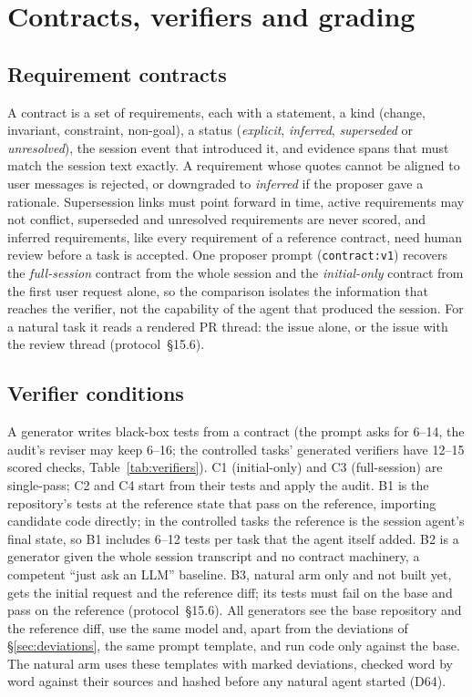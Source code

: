 \section{Contracts, verifiers and grading}
\label{sec:method}
\subsection{Requirement contracts}
\label{sec:contracts}
A contract is a set of requirements, each with a statement, a kind (change, invariant, constraint, non-goal), a status (\emph{explicit}, \emph{inferred}, \emph{superseded} or \emph{unresolved}), the session event that introduced it, and evidence spans that must match the session text exactly. A requirement whose quotes cannot be aligned to user messages is rejected, or downgraded to \emph{inferred} if the proposer gave a rationale. Supersession links must point forward in time, active requirements may not conflict, superseded and unresolved requirements are never scored, and inferred requirements, like every requirement of a reference contract, need human review before a task is accepted. One proposer prompt (\texttt{contract:v1}) recovers the \emph{full-session} contract from the whole session and the \emph{initial-only} contract from the first user request alone, so the comparison isolates the information that reaches the verifier, not the capability of the agent that produced the session. For a natural task it reads a rendered PR thread: the issue alone, or the issue with the review thread (protocol~\S15.6).

\subsection{Verifier conditions}
\label{sec:conditions}
A generator writes black-box tests from a contract (the prompt asks for 6--14, the audit's reviser may keep 6--16; the controlled tasks' generated verifiers have 12--15 scored checks, Table~\ref{tab:verifiers}). C1 (initial-only) and C3 (full-session) are single-pass; C2 and C4 start from their tests and apply the audit. B1 is the repository's tests at the reference state that pass on the reference, importing candidate code directly; in the controlled tasks the reference is the session agent's final state, so B1 includes 6--12 tests per task that the agent itself added. B2 is a generator given the whole session transcript and no contract machinery, a competent ``just ask an LLM'' baseline. B3, natural arm only and not built yet, gets the initial request and the reference diff; its tests must fail on the base and pass on the reference (protocol~\S15.6). All generators see the base repository and the reference diff, use the same model and, apart from the deviations of \S\ref{sec:deviations}, the same prompt template, and run code only against the base. The natural arm uses these templates with marked deviations, checked word by word against their sources and hashed before any natural agent started (D64).

